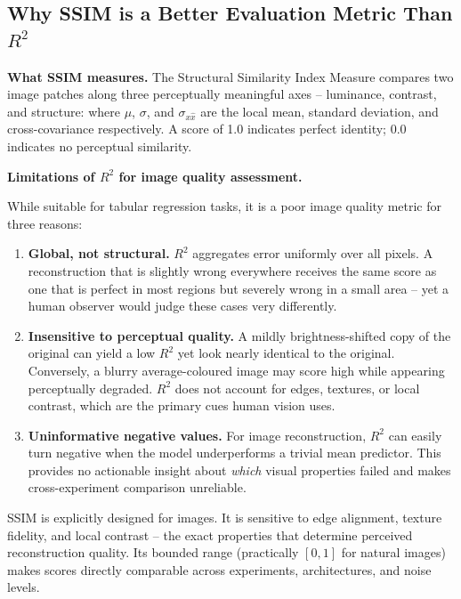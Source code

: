 \documentclass[12pt,a4paper]{article}
\begin{document}
\subsection{Why SSIM is a Better Evaluation Metric Than $R^2$}

\textbf{What SSIM measures.}
The Structural Similarity Index Measure compares two image patches along three
perceptually meaningful axes -- luminance, contrast, and structure:
where $\mu$, $\sigma$, and $\sigma_{x\hat{x}}$ are the local mean,
standard deviation, and cross-covariance respectively.
A score of 1.0 indicates perfect identity; 0.0 indicates no perceptual
similarity.

\medskip
\noindent\textbf{Limitations of $R^2$ for image quality assessment.}

While suitable for tabular regression tasks, it is a poor image quality metric
for three reasons:

\begin{enumerate}[leftmargin=*, itemsep=5pt]
  \item \textbf{Global, not structural.}
        $R^2$ aggregates error uniformly over all pixels. A reconstruction
        that is slightly wrong everywhere receives the same score as one that
        is perfect in most regions but severely wrong in a small area -- yet
        a human observer would judge these cases very differently.

  \item \textbf{Insensitive to perceptual quality.}
        A mildly brightness-shifted copy of the original can yield a low $R^2$
        yet look nearly identical to the original. Conversely, a blurry
        average-coloured image may score high while appearing perceptually
        degraded. $R^2$ does not account for edges, textures, or local
        contrast, which are the primary cues human vision uses.

  \item \textbf{Uninformative negative values.}
        For image reconstruction, $R^2$ can easily turn negative when the
        model underperforms a trivial mean predictor. This provides no
        actionable insight about \emph{which} visual properties failed
        and makes cross-experiment comparison unreliable.
\end{enumerate}

\noindent SSIM is explicitly designed for images. It is sensitive to edge
alignment, texture fidelity, and local contrast -- the exact properties that
determine perceived reconstruction quality. Its bounded range (practically
$[0, 1]$ for natural images) makes scores directly comparable across
experiments, architectures, and noise levels.
\end{document}
